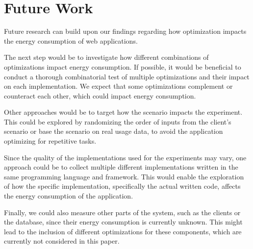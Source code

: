 \documentclass[main.tex]{subfiles}
\begin{document}
\section{Future Work}
Future research can build upon our findings regarding how optimization impacts the energy consumption of web applications.

The next step would be to investigate how different combinations of optimizations impact energy consumption. If possible, it would be beneficial to conduct a thorough combinatorial test of multiple optimizations and their impact on each implementation. We expect that some optimizations complement or counteract each other, which could impact energy consumption.

Other approaches would be to target how the scenario impacts the experiment. This could be explored by randomizing the order of inputs from the client's scenario or base the scenario on real usage data, to avoid the application optimizing for repetitive tasks. 

Since the quality of the implementations used for the experiments may vary, one approach could be to collect multiple different implementations written in the same programming language and framework. This would enable the exploration of how the specific implementation, specifically the actual written code, affects the energy consumption of the application. 

Finally, we could also measure other parts of the system, such as the clients or the database, since their energy consumption is currently unknown. This might lead to the inclusion of different optimizations for these components, which are currently not considered in this paper.
\end{document}
